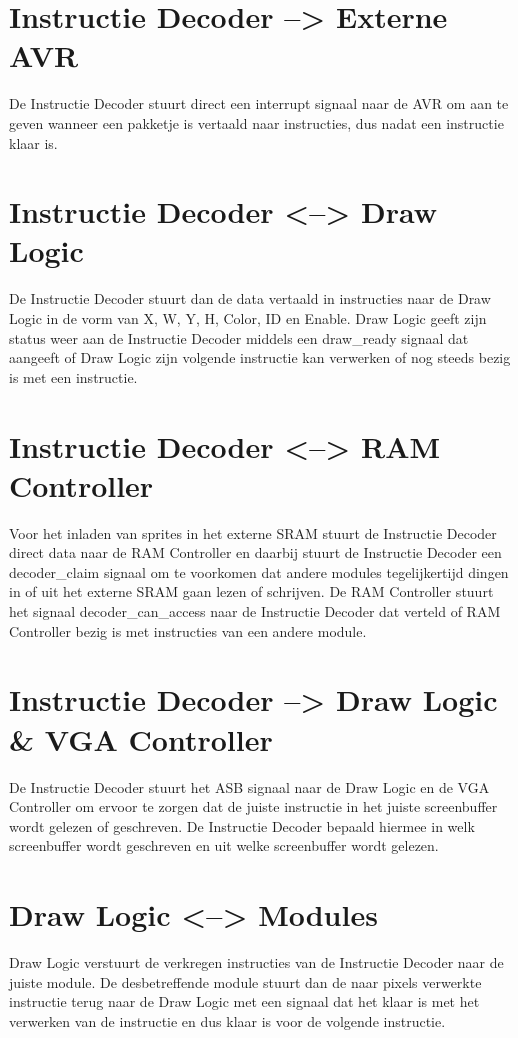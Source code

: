 \documentclass{scrartcl} %
\begin{document}
\section{Instructie Decoder --> Externe AVR}
De Instructie Decoder stuurt direct een interrupt signaal naar de AVR om aan te geven wanneer een pakketje is vertaald naar instructies, dus nadat een instructie klaar is.

\section{Instructie Decoder <--> Draw Logic}
De Instructie Decoder stuurt dan de data vertaald in instructies naar de Draw Logic in de vorm van X, W, Y, H, Color, ID en Enable. Draw Logic geeft zijn status weer aan de Instructie Decoder middels een draw\_ready signaal dat aangeeft of Draw Logic zijn volgende instructie kan verwerken of nog steeds bezig is met een instructie.

\section {Instructie Decoder <--> RAM Controller}
Voor het inladen van sprites in het externe SRAM stuurt de Instructie Decoder direct data naar de RAM Controller en daarbij stuurt de Instructie Decoder een decoder\_claim signaal om te voorkomen dat andere modules tegelijkertijd dingen in of uit het externe SRAM gaan lezen of schrijven. De RAM Controller stuurt het signaal decoder\_can\_access naar de Instructie Decoder dat verteld of RAM Controller bezig is met instructies van een andere module.

\section {Instructie Decoder --> Draw Logic \& VGA Controller}
De Instructie Decoder stuurt het ASB signaal naar de Draw Logic en de VGA Controller om ervoor te zorgen dat de juiste instructie in het juiste screenbuffer wordt gelezen of geschreven. De Instructie Decoder bepaald hiermee in welk screenbuffer wordt geschreven en uit welke screenbuffer wordt gelezen.

\section {Draw Logic <--> Modules}
Draw Logic verstuurt de verkregen instructies van de Instructie Decoder naar de juiste module. De desbetreffende module stuurt dan de naar pixels verwerkte instructie terug naar de Draw Logic met een signaal dat het klaar is met het verwerken van de instructie en dus klaar is voor de volgende instructie.
\end{document}
